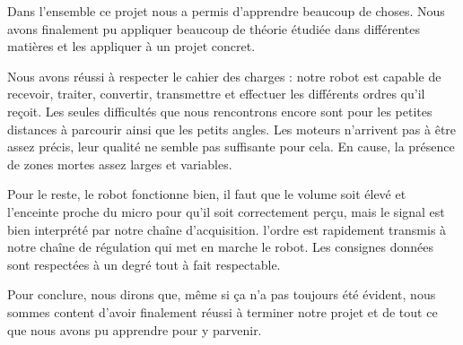 Dans l’ensemble ce projet nous a permis d’apprendre beaucoup de choses. Nous avons finalement pu appliquer beaucoup de théorie étudiée dans différentes matières et les appliquer à un projet concret. 

Nous avons réussi à respecter le cahier des charges : notre robot est capable de recevoir, traiter, convertir, transmettre et effectuer les différents ordres qu’il reçoit. Les seules difficultés que nous rencontrons encore sont pour les petites distances à parcourir ainsi que les petits angles. Les moteurs n’arrivent pas à être assez précis, leur qualité ne semble pas suffisante pour cela. En cause, la présence de zones mortes assez larges et variables. 

Pour le reste, le robot fonctionne bien, il faut que le volume soit élevé et l’enceinte proche du micro pour qu'il soit correctement perçu, mais le signal est bien interprété par notre chaîne d’acquisition. l’ordre est rapidement transmis à notre chaîne de régulation qui met en marche le robot. Les consignes données sont respectées à un degré tout à fait respectable. 

Pour conclure, nous dirons que, même si ça n'a pas toujours été évident, nous sommes content d'avoir finalement réussi à terminer notre projet et de tout ce que nous avons pu apprendre pour y parvenir.
